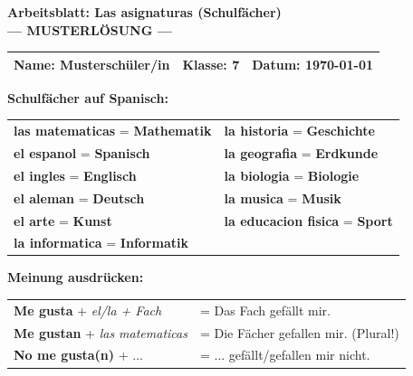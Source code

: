 \documentclass[11pt, a4paper]{article}
\newcommand{\fachfarbe}{spanisch}
\newcommand{\thema}{Las asignaturas (Schulfächer)}
\newcommand{\klasse}{7}
\newcommand{\datum}{\today}
\newcommand{\loesung}[1]{\textcolor{loesung}{\textbf{#1}}}
\newcommand{\es}[1]{\textcolor{\fachfarbe}{\textbf{#1}}}
\begin{document}

\begin{center}
    {\Large\bfseries\textcolor{\fachfarbe}{Arbeitsblatt: \thema}}\\[0.3em]
    {\large\textcolor{loesung}{\textbf{--- MUSTERLÖSUNG ---}}}
\end{center}

\vspace{5pt}

\noindent
\begin{tabularx}{\textwidth}{|X|X|X|}
\hline
\textbf{Name:} \textcolor{loesung}{Musterschüler/in} &
\textbf{Klasse:} \klasse &
\textbf{Datum:} \datum \\
\hline
\end{tabularx}

\vspace{15pt}


\begin{merkkasten}
\textbf{Schulfächer auf Spanisch:}

\vspace{0.5em}

\begin{tabular}{p{5cm}p{5cm}}
\es{las matematicas} = \loesung{Mathematik} & \es{la historia} = \loesung{Geschichte} \\[0.8em]
\es{el espanol} = \loesung{Spanisch} & \es{la geografia} = \loesung{Erdkunde} \\[0.8em]
\es{el ingles} = \loesung{Englisch} & \es{la biologia} = \loesung{Biologie} \\[0.8em]
\es{el aleman} = \loesung{Deutsch} & \es{la musica} = \loesung{Musik} \\[0.8em]
\es{el arte} = \loesung{Kunst} & \es{la educacion fisica} = \loesung{Sport} \\[0.8em]
\es{la informatica} = \loesung{Informatik} & \\
\end{tabular}

\vspace{0.8em}

\textbf{Meinung ausdrücken:}

\vspace{0.3em}

\begin{tabular}{ll}
\es{Me gusta} + \textit{el/la + Fach} & = Das Fach gefällt mir. \\[0.4em]
\es{Me gustan} + \textit{las matematicas} & = Die Fächer gefallen mir. (Plural!) \\[0.4em]
\es{No me gusta(n)} + ... & = ... gefällt/gefallen mir nicht. \\
\end{tabular}

\end{merkkasten}
\end{document}
